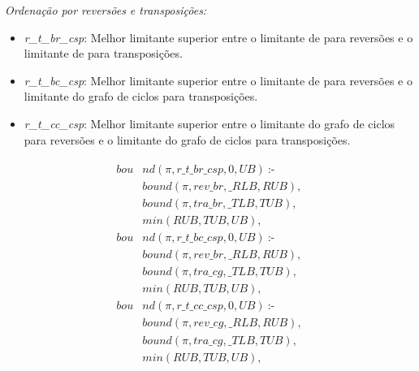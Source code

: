 \textit{Ordenação por reversões e transposições:} 
\begin{itemize}
\item{\textit{r\_t\_br\_csp}: 
Melhor limitante superior entre o limitante de \bkp{} para reversões e
o limitante de \bkp{} para transposições.}
\item{\textit{r\_t\_bc\_csp}:
Melhor limitante superior entre o limitante de \bkp{} para reversões e
o limitante do grafo de ciclos para transposições.}
\item{\textit{r\_t\_cc\_csp}: 
Melhor limitante superior entre o limitante do grafo de ciclos para
reversões e o limitante do grafo de ciclos para transposições.}
\end{itemize}
\begin{align}
  \label{bound_r_t}
  \begin{split}
  \textit{bou}&\textit{nd}(\pi, r\_t\_br\_csp, 0, UB)~\text{:-} \\
  &\textit{bound}(\pi, rev\_br, \_RLB, RUB), \\
  &\textit{bound}(\pi, tra\_br, \_TLB, TUB), \\
  &\textit{min}(RUB, TUB, UB), \\
  \textit{bou}&\textit{nd}(\pi, r\_t\_bc\_csp, 0, UB)~\text{:-} \\
  &\textit{bound}(\pi, rev\_br, \_RLB, RUB), \\
  &\textit{bound}(\pi, tra\_cg, \_TLB, TUB), \\
  &\textit{min}(RUB, TUB, UB), \\
  \textit{bou}&\textit{nd}(\pi, r\_t\_cc\_csp, 0, UB)~\text{:-} \\
  &\textit{bound}(\pi, rev\_cg, \_RLB, RUB), \\
  &\textit{bound}(\pi, tra\_cg, \_TLB, TUB), \\
  &\textit{min}(RUB, TUB, UB), 
  \end{split}
\end{align}

